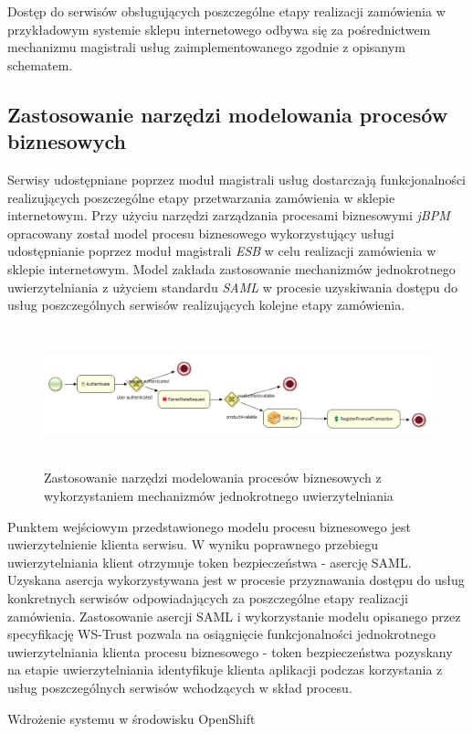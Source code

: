 	Dostęp do serwisów obsługujących poszczególne etapy realizacji zamówienia w przykładowym systemie sklepu internetowego odbywa się za pośrednictwem mechanizmu magistrali usług zaimplementowanego zgodnie z opisanym schematem. 
	
	\subsection{Zastosowanie narzędzi modelowania procesów biznesowych}

	Serwisy udostępniane poprzez moduł magistrali usług dostarczają funkcjonalności realizujących poszczególne etapy przetwarzania zamówienia w sklepie internetowym. Przy użyciu narzędzi zarządzania procesami biznesowymi \textit{jBPM} opracowany został model procesu biznesowego wykorzystujący usługi udostępnianie poprzez moduł magistrali \textit{ESB} w celu realizacji zamówienia w sklepie internetowym. Model zakłada zastosowanie mechanizmów jednokrotnego uwierzytelniania z użyciem standardu \textit{SAML} w procesie uzyskiwania dostępu do usług poszczególnych serwisów realizujących kolejne etapy zamówienia. 

		\begin{figure}[h]
			\centering
			\includegraphics[width=18cm,height=4cm]{img/jbpm_order_process.png}
			\caption{Zastosowanie narzędzi modelowania procesów biznesowych z wykorzystaniem mechanizmów jednokrotnego uwierzytelniania}
			\label{jBPM process}
		\end{figure}

	Punktem wejściowym przedstawionego modelu procesu biznesowego jest uwierzytelnienie klienta serwisu. W wyniku poprawnego przebiegu uwierzytelniania klient otrzymuje token bezpieczeństwa - asercję SAML. Uzyskana asercja wykorzystywana jest w procesie przyznawania dostępu do usług konkretnych serwisów odpowiadających za poszczególne etapy realizacji zamówienia. Zastosowanie asercji SAML i wykorzystanie modelu opisanego przez specyfikację WS-Trust pozwala na osiągnięcie funkcjonalności jednokrotnego uwierzytelniania klienta procesu biznesowego - token bezpieczeństwa pozyskany na etapie uwierzytelniania identyfikuje klienta aplikacji podczas korzystania z usług poszczególnych serwisów wchodzących w skład procesu.

Wdrożenie systemu w środowisku OpenShift

